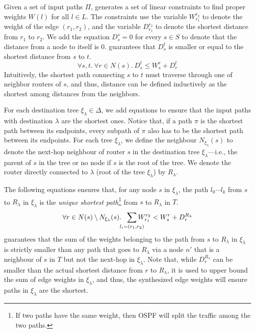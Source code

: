Given a set of input paths $\Pi$, \name 
generates a set of linear constraints to 
find proper weights $W(l)$ 
for all $l \in L$.
The constraints use the variable $W_{r_1}^{r_2}$
to denote the weight of the edge $(r_1, r_2)$, and the variable
$D_{r_1}^{r_2}$ to denote the 
shortest distance from $r_1$ to $r_2$.
We add the equation $D_{s}^{s} = 0$ 
for every $s\in S$ to denote that the distance
from a node to itself is $0$.
 guarantees that $D_{s}^{t}$ is smaller or equal to
the shortest distance from $s$ to $t$.
\begin{equation} \label{eq:distance}
\forall s, t. ~\forall r \in N(s).~
D_s^t \leq W_s^r + D_r^t
\end{equation}
Intuitively, the shortest path connecting $s$ to $t$
must traverse through one of neighbor routers of $s$,
and thus, distance can be defined inductively as the 
shortest among distances from the neighbors. 

For each destination tree $\xi_\lambda\in\Delta$, we add equations to ensure 
that the input paths with destination $\lambda$ are the shortest ones.
Notice that, if a path $\pi$
is the shortest path between its endpoints, every 
subpath of $\pi$ also has to be the shortest path between its endpoints.
For each tree $\xi_\lambda$, we define the neighbour
 $N_{\xi_\lambda}(s)$ to denote the 
next-hop neighbour of router $s$ in the destination tree $\xi_\lambda$---i.e., the parent
of $s$ in the tree or no node if $s$ is the root of the tree. We denote the
router directly connected to $\lambda$ (root of the tree $\xi_\lambda$) by $R_\lambda$.

The following equations ensures that, for any node $s$ in 
$\xi_\lambda$, 
the path $l_0\cdots l_k$ from $s$ to $R_\lambda$ 
in $\xi_\lambda$ is the 
\emph{unique shortest path}\footnote{
If two paths have the same weight, then OSPF will 
split the traffic among the two paths.
} from $s$ to $R_\lambda$ in $T$.
\begin{equation} \label{eq:unique}
\forall r \in N(s) \setminus N_{\xi_\lambda}(s).~~
\sum_{\mathclap{\substack{l_i=(r_1,r_2)}}} 
W_{r_1}^{r_2} < W_{s}^{r}+ D_{r}^{R_\lambda}
\end{equation}
 guarantees that 
the sum of the weights belonging to the path 
from $s$ to $R_\lambda$ in $\xi_\lambda$ 
is strictly smaller than 
any path that goes to $R_\lambda$ via 
a node $n'$ that is a neighbour of $s$ in $T$ but not 
the next-hop in $\xi_\lambda$. Note that,
while $D_{r}^{R_\lambda}$ can be smaller 
than the actual shortest
distance from $r$ to $R_\lambda$, 
it is used to upper bound the sum of edge weights 
in $\xi_\lambda$, and  
thus, the synthesized edge weights will ensure 
paths in $\xi_\lambda$ are the shortest. 

